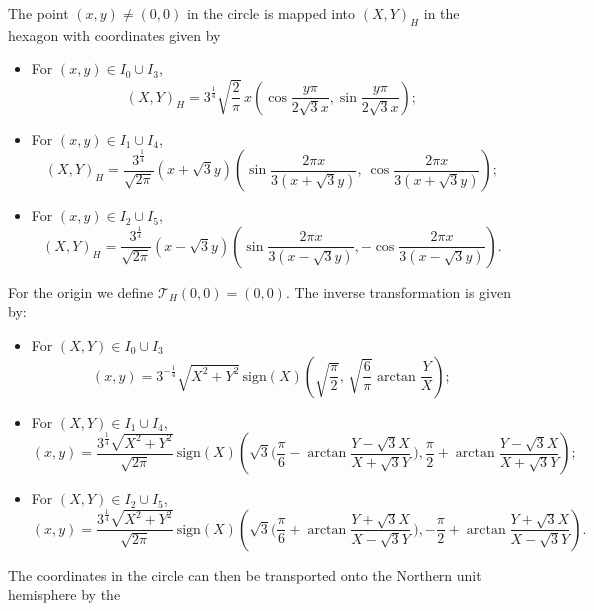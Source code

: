 \documentclass[DIV=calc, paper=letter, fontsize=11pt]{scrartcl}	 %
\begin{document}
The point $(x,y)\neq(0,0)$ in the circle is mapped into $(X,Y)_H$ in the hexagon with coordinates given by
\begin{itemize}
\item For $(x,y)\in I_0 \cup I_3$,
\begin{equation}\label{a03}
 (X,Y)_H=3^{\frac 14}{\sqrt{\frac 2\pi}}\, x \left(
\cos\frac{y\pi}{2\sqrt{3}x},\sin\frac{y\pi}{2\sqrt{3}x}\right);
\end{equation}
\item For $(x,y)\in I_1 \cup I_4$,
\begin{equation}\label{a14}
 (X,Y)_H = \frac{3^{\frac 14}}{\sqrt{2\pi}} (x+\sqrt 3y) \left(
\sin\frac{2\pi x}{3(x+\sqrt{3}y)},\ \cos\frac{2\pi
x}{3(x+\sqrt{3}y)}\right);
\end{equation}
\item For $(x,y)\in I_2 \cup I_5$,
\begin{equation}\label{a25}
 (X,Y)_H = \frac{3^{\frac 14}}{\sqrt{2\pi}} (x-\sqrt 3y) \left(
\sin\frac{2\pi x}{3(x-\sqrt{3}y)},-\cos\frac{2\pi
x}{3(x-\sqrt{3}y)}\right).
\end{equation}
\end{itemize}
For the origin we define $\mathcal T_H(0,0)=(0,0)$.  The inverse transformation is given by:
\begin{itemize}
\item For $(X,Y)\in I_0\cup I_3$
\begin{equation}\label{f03}
 (x,y)=3^{-\frac 14}\sqrt {X^2+Y^2}\,\mbox{sign}(X)\left(
\sqrt{\frac \pi 2},\,\sqrt{\frac 6\pi} \arctan \frac YX \right);
\end{equation}
\item For $(X,Y)\in I_1\cup I_4$,
\begin{equation}\label{f14}
 (x,y)=\frac{3^\frac 14\sqrt {X^2+Y^2}}{\sqrt
{2\pi}}\,\mbox{sign}(X)\left(
\sqrt3\Big(\frac \pi 6-\arctan \frac{Y-\sqrt 3 X}{X+\sqrt 3 Y}\,\Big),
\frac \pi 2+\arctan \frac{Y-\sqrt 3 X}{X+\sqrt 3 Y} \right);
\end{equation}
\item For $(X,Y)\in I_2\cup I_5$,
\begin{equation}\label{f25}
 (x,y)=\frac{3^\frac 14\sqrt {X^2+Y^2}}{\sqrt
{2\pi}}\,\mbox{sign}(X)\left(
\sqrt3\Big(\frac \pi 6+\arctan \frac{Y+\sqrt 3 X}{X-\sqrt 3 Y}\,\Big),
-\frac \pi 2+\arctan \frac{Y+\sqrt 3 X}{X-\sqrt 3Y} \right).
\end{equation}
\end{itemize}
The coordinates in the circle can then be transported onto the Northern unit hemisphere by the 
\end{document}
